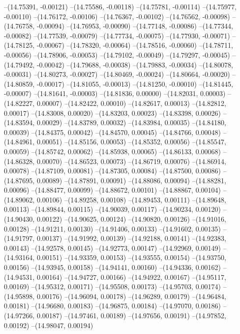 --(14.75391, -0.00121)
--(14.75586, -0.00118)
--(14.75781, -0.00114)
--(14.75977, -0.00110)
--(14.76172, -0.00106)
--(14.76367, -0.00102)
--(14.76562, -0.00098)
--(14.76758, -0.00094)
--(14.76953, -0.00090)
--(14.77148, -0.00086)
--(14.77344, -0.00082)
--(14.77539, -0.00079)
--(14.77734, -0.00075)
--(14.77930, -0.00071)
--(14.78125, -0.00067)
--(14.78320, -0.00064)
--(14.78516, -0.00060)
--(14.78711, -0.00056)
--(14.78906, -0.00053)
--(14.79102, -0.00049)
--(14.79297, -0.00045)
--(14.79492, -0.00042)
--(14.79688, -0.00038)
--(14.79883, -0.00034)
--(14.80078, -0.00031)
--(14.80273, -0.00027)
--(14.80469, -0.00024)
--(14.80664, -0.00020)
--(14.80859, -0.00017)
--(14.81055, -0.00013)
--(14.81250, -0.00010)
--(14.81445, -0.00007)
--(14.81641, -0.00003)
--(14.81836, 0.00000)
--(14.82031, 0.00003)
--(14.82227, 0.00007)
--(14.82422, 0.00010)
--(14.82617, 0.00013)
--(14.82812, 0.00017)
--(14.83008, 0.00020)
--(14.83203, 0.00023)
--(14.83398, 0.00026)
--(14.83594, 0.00029)
--(14.83789, 0.00032)
--(14.83984, 0.00035)
--(14.84180, 0.00039)
--(14.84375, 0.00042)
--(14.84570, 0.00045)
--(14.84766, 0.00048)
--(14.84961, 0.00051)
--(14.85156, 0.00053)
--(14.85352, 0.00056)
--(14.85547, 0.00059)
--(14.85742, 0.00062)
--(14.85938, 0.00065)
--(14.86133, 0.00068)
--(14.86328, 0.00070)
--(14.86523, 0.00073)
--(14.86719, 0.00076)
--(14.86914, 0.00078)
--(14.87109, 0.00081)
--(14.87305, 0.00084)
--(14.87500, 0.00086)
--(14.87695, 0.00089)
--(14.87891, 0.00091)
--(14.88086, 0.00094)
--(14.88281, 0.00096)
--(14.88477, 0.00099)
--(14.88672, 0.00101)
--(14.88867, 0.00104)
--(14.89062, 0.00106)
--(14.89258, 0.00108)
--(14.89453, 0.00111)
--(14.89648, 0.00113)
--(14.89844, 0.00115)
--(14.90039, 0.00117)
--(14.90234, 0.00120)
--(14.90430, 0.00122)
--(14.90625, 0.00124)
--(14.90820, 0.00126)
--(14.91016, 0.00128)
--(14.91211, 0.00130)
--(14.91406, 0.00133)
--(14.91602, 0.00135)
--(14.91797, 0.00137)
--(14.91992, 0.00139)
--(14.92188, 0.00141)
--(14.92383, 0.00143)
--(14.92578, 0.00145)
--(14.92773, 0.00147)
--(14.92969, 0.00149)
--(14.93164, 0.00151)
--(14.93359, 0.00153)
--(14.93555, 0.00154)
--(14.93750, 0.00156)
--(14.93945, 0.00158)
--(14.94141, 0.00160)
--(14.94336, 0.00162)
--(14.94531, 0.00164)
--(14.94727, 0.00166)
--(14.94922, 0.00167)
--(14.95117, 0.00169)
--(14.95312, 0.00171)
--(14.95508, 0.00173)
--(14.95703, 0.00174)
--(14.95898, 0.00176)
--(14.96094, 0.00178)
--(14.96289, 0.00179)
--(14.96484, 0.00181)
--(14.96680, 0.00183)
--(14.96875, 0.00184)
--(14.97070, 0.00186)
--(14.97266, 0.00187)
--(14.97461, 0.00189)
--(14.97656, 0.00191)
--(14.97852, 0.00192)
--(14.98047, 0.00194)
